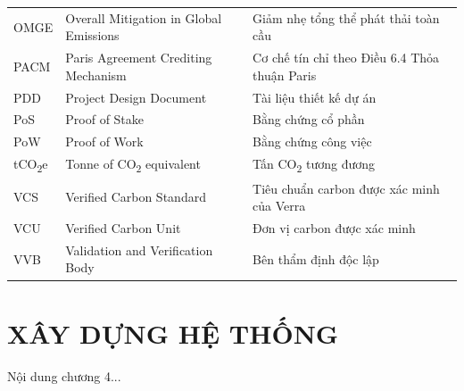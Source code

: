 \documentclass[a4paper,oneside]{report}
\numberwithin{equation}{chapter}
\begin{document}
\begin{longtable}{@{}p{2.4cm}p{5.4cm}p{6.3cm}@{}}
OMGE   & Overall Mitigation in Global Emissions    & Giảm nhẹ tổng thể phát thải toàn cầu \\
PACM   & Paris Agreement Crediting Mechanism       & Cơ chế tín chỉ theo Điều 6.4 Thỏa thuận Paris \\
PDD    & Project Design Document                   & Tài liệu thiết kế dự án \\
PoS    & Proof of Stake                            & Bằng chứng cổ phần \\
PoW    & Proof of Work                             & Bằng chứng công việc \\
tCO\textsubscript{2}e & Tonne of CO\textsubscript{2} equivalent & Tấn CO\textsubscript{2} tương đương \\
VCS    & Verified Carbon Standard                  & Tiêu chuẩn carbon được xác minh của Verra \\
VCU    & Verified Carbon Unit                      & Đơn vị carbon được xác minh \\
VVB    & Validation and Verification Body          & Bên thẩm định độc lập \\
\end{longtable}

\clearpage
{}







\chapter{XÂY DỰNG HỆ THỐNG}
Nội dung chương 4...

\end{document}
